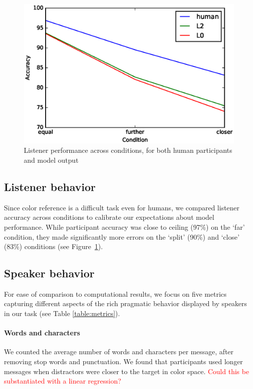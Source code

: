 \documentclass[11pt,letterpaper]{article}
\renewcommand{\|}{\mid}
\newcommand{\figref}[1]{Figure~\ref{#1}}
\newcommand{\todocheck}[1]{\textcolor{red}{#1}}
\begin{document}
\begin{figure}
\includegraphics[scale = .5]{figures/allListenerAccuracy.eps}
\caption{Listener performance across conditions, for both human participants and model output}
\label{fig:listenerAccuracy}
\end{figure}

\subsection{Listener behavior}

Since color reference is a difficult task even for humans, we compared listener accuracy across conditions to calibrate our expectations about model performance. While participant accuracy was close to ceiling (97\%) on the `far' condition, they made significantly more errors on the `split' (90\%) and `close' (83\%) conditions (see \figref{fig:listenerAccuracy}).

\subsection{Speaker behavior}

For ease of comparison to computational results, we focus on five metrics capturing different aspects of the rich pragmatic behavior displayed by speakers in our task (see Table \ref{table:metrics}). 

\paragraph{Words and characters} We counted the average number of words and characters per message, after removing stop words and punctuation. We found that participants used longer messages when distractors were closer to the target in color space.
\todocheck{Could this be substantiated with a linear regression?}
\end{document}
